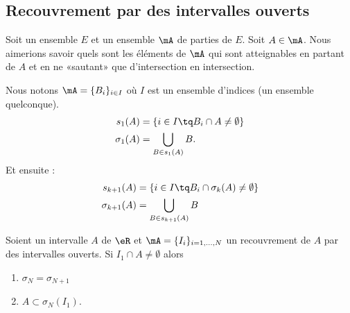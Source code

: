 \subsection{Recouvrement par des intervalles ouverts}

Soit un ensemble \( E\) et un ensemble \( \mA\) de parties de \( E\). Soit \( A\in \mA\). Nous aimerions savoir quels sont les éléments de \( \mA\) qui sont atteignables en partant de \( A\) et en ne «sautant» que d'intersection en intersection.

Nous notons \( \mA=\{ B_i \}_{i\in I}\) où \( I\) est un ensemble d'indices (un ensemble quelconque).
\begin{subequations}
	\begin{align}
		s_1(A)      & =\{  i\in I\tq B_i\cap A\neq \emptyset   \} \\
		\sigma_1(A) & =\bigcup_{B\in s_1(A)}B.
	\end{align}
\end{subequations}
Et ensuite :
\begin{subequations}
	\begin{align}
		s_{k+1}(A)      & =\{ i\in I\tq B_i\cap \sigma_k(A)\neq \emptyset \} \\
		\sigma_{k+1}(A) & =\bigcup_{B\in s_{k+1}(A)}B
	\end{align}
\end{subequations}

\begin{lemma}       \label{LEMooJHMTooXwxSAa}
	Soient un intervalle \( A\) de \( \eR\) et \( \mA=\{ I_i \}_{i=1,\ldots, N}\) un recouvrement de \( A\) par des intervalles ouverts. Si \( I_1\cap A\neq \emptyset\) alors
	\begin{enumerate}
		\item
		      \( \sigma_{N}=\sigma_{N+1}\)
		\item
		      \( A\subset \sigma_N(I_1)\).
	\end{enumerate}
\end{lemma}

